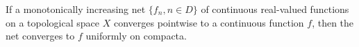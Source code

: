 If a monotonically increasing net $\{f_n, n \in D\}$ of continuous real-valued functions on a topological space $X$ converges pointwise to a continuous function $f$, then the net converges to $f$ uniformly on compacta.
